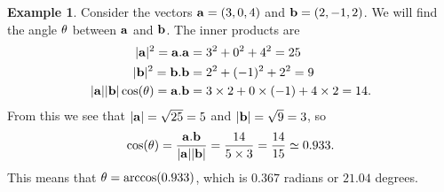 \documentclass[reqno]{amsart}
\theoremstyle{definition}
\newtheorem{example}[theorem]{Example}
\begin{document}
\begin{example}
 Consider the vectors $\mathbf{a}=(3,0,4)$ and $\mathbf{b}=(2,-1,2)$.  We will find
 the angle $\theta$ between $\mathbf{a}$ and $\mathbf{b}$.  The inner products are 
 \begin{align*}
  |\mathbf{a}|^2 = \mathbf{a}.\mathbf{a} &= 3^2+0^2+4^2 = 25 \\
  |\mathbf{b}|^2 = \mathbf{b}.\mathbf{b} &= 2^2+(-1)^2+2^2 = 9 \\
  |\mathbf{a}||\mathbf{b}|\cos(\theta) = \mathbf{a}.\mathbf{b} &= 3\times 2 + 0\times(-1) + 4\times 2 = 14.
 \end{align*}
 From this we see that $|\mathbf{a}|=\sqrt{25}=5$ and $|\mathbf{b}|=\sqrt{9}=3$, so 
 \[ \cos(\theta) = \frac{\mathbf{a}.\mathbf{b}}{|\mathbf{a}||\mathbf{b}|} = \frac{14}{5\times 3}
     = \frac{14}{15} \simeq 0.933.
 \]
 This means that $\theta=\arccos(0.933)$, which is $0.367$ radians or
 $21.04$ degrees.
\end{example}
\end{document}
